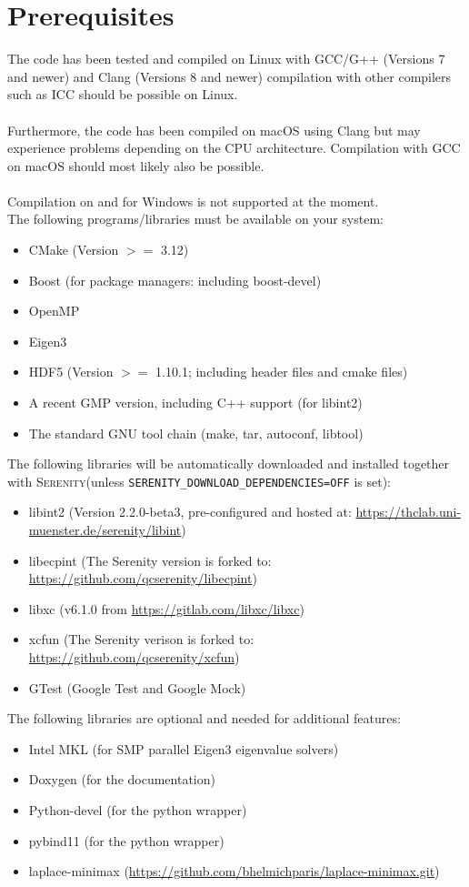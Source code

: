 \documentclass[bibliography=totocnumbered,a4paper,10pt,oneside]{scrbook}
\newcommand{
\serenity}{\textsc{Serenity}\xspace}
\begin{document}
\section{Prerequisites}
The code has been tested and compiled on Linux with GCC/G++
(Versions 7 and newer) and Clang (Versions 8 and newer)
compilation with other compilers such as ICC should be
possible on Linux.\\
\\
Furthermore, the code has been compiled on macOS using Clang
but may experience problems depending on the CPU architecture.
Compilation with GCC on macOS should most likely also be possible.\\
\\
Compilation on and for Windows is not supported at the moment.
\\
The following programs/libraries must be available on your system:
\begin{itemize}
 \item CMake (Version $>=$ 3.12)
 \item Boost (for package managers: including boost-devel)
 \item OpenMP
 \item Eigen3
 \item HDF5 (Version $>=$ 1.10.1; including header files and cmake files)
 \item A recent GMP version, including C++ support (for libint2)
 \item The standard GNU tool chain (make, tar, autoconf, libtool)
\end{itemize}
The following libraries will be automatically downloaded and installed together
with \serenity (unless \texttt{SERENITY\_DOWNLOAD\_DEPENDENCIES=OFF} is set):
\begin{itemize}
 \item libint2 (Version 2.2.0-beta3, pre-configured and hosted at: \url{https://thclab.uni-muenster.de/serenity/libint})
 \item libecpint (The Serenity version is forked to: \url{https://github.com/qcserenity/libecpint})
 \item libxc (v6.1.0 from \url{https://gitlab.com/libxc/libxc})
 \item xcfun (The Serenity verison is forked to: \url{https://github.com/qcserenity/xcfun})
 \item GTest (Google Test and Google Mock)
\end{itemize}
The following libraries are optional and needed for additional features:
\begin{itemize}
 \item Intel MKL (for SMP parallel Eigen3 eigenvalue solvers)
 \item Doxygen (for the documentation)
 \item Python-devel (for the python wrapper)
 \item pybind11 (for the python wrapper)
 \item laplace-minimax (\url{https://github.com/bhelmichparis/laplace-minimax.git})
\end{itemize}
\end{document}
